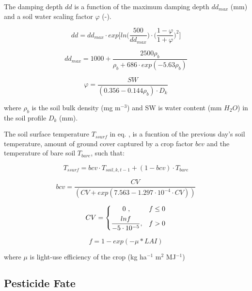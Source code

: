 \documentclass[]{article}
\begin{document}
The damping depth \(dd\) is a function of the maximum damping depth
\(dd_{max}\) (mm) and a soil water scaling factor \(\varphi\) (-).

\begin{equation}
dd = dd_{max} \cdot exp \Big[ln\Big(\frac{500}{dd_{max}} \Big) \cdot \Big(\frac{1-\varphi}{1+\varphi}\Big)^2\Big]
\label{eq:dd} 
\end{equation}

\begin{equation} 
dd_{max} = 1000 + \frac{2500\rho_b}{\rho_b+686 \cdot exp(-5.63\rho_b)}
\label{eq:ddmax} 
\end{equation}

\begin{equation} 
\varphi = \frac{SW}{(0.356-0.144\rho_b) \cdot D_{k}}
\label{eq:varphi} 
\end{equation}

where \(\rho_b\) is the soil bulk density (mg m\(^{-3}\)) and SW is
water content (mm \(H_2O\)) in the soil profile \(D_k\) (mm).

The soil surface temperature \(T_{ssurf}\) in eq. , is a
fucntion of the previous day's soil temperature, amount of ground cover
captured by a crop factor \(bcv\) and the temperature of bare soil
\(T_{bare}\), such that:

\begin{equation} 
T_{ssurf} = bcv \cdot  T_{soil, k, t-1} + (1-bcv) \cdot T_{bare}
\label{eq:Tssurf} 
\end{equation}

\begin{equation} 
bcv = \frac{CV}{(CV+exp(7.563-1.297 \cdot 10^{-4} \cdot CV))}
\label{eq:Tssurf} 
\end{equation}

\begin{equation} 
    CV = 
\begin{dcases}
     ~~~~~0~,                                     & f \leq 0 \\
    \frac{lnf}{-5\cdot10^{-5}},              & f > 0 
\end{dcases}
\end{equation}

\begin{equation} 
f=1-exp(-\mu*LAI)
\label{eq:f} 
\end{equation}

where \(\mu\) is light-use efficiency of the crop (kg ha\(^{-1}\)
m\(^2\) MJ\(^{-1}\))

\subsection{Pesticide Fate}\label{pesticide-fate}
\end{document}
